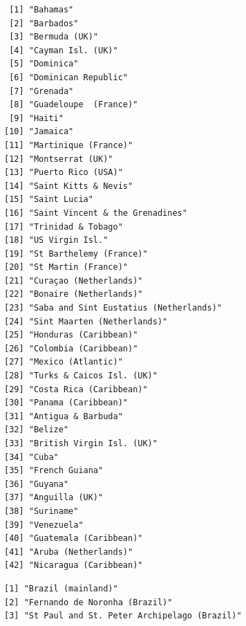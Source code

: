 \documentclass[
  letterpaper,
  oneside,
  open=any]{scrbook}
\newenvironment{Shaded}{\begin{snugshade}}{\end{snugshade}}
\newcommand{\CommentTok}[1]{\textcolor[rgb]{0.37,0.37,0.37}{#1}}
\newcommand{\FunctionTok}[1]{\textcolor[rgb]{0.28,0.35,0.67}{#1}}
\newcommand{\NormalTok}[1]{\textcolor[rgb]{0.00,0.23,0.31}{#1}}
\newcommand{\SpecialCharTok}[1]{\textcolor[rgb]{0.37,0.37,0.37}{#1}}
\newcommand{\StringTok}[1]{\textcolor[rgb]{0.13,0.47,0.30}{#1}}
\begin{document}
\begin{verbatim}
 [1] "Bahamas"                              
 [2] "Barbados"                             
 [3] "Bermuda (UK)"                         
 [4] "Cayman Isl. (UK)"                     
 [5] "Dominica"                             
 [6] "Dominican Republic"                   
 [7] "Grenada"                              
 [8] "Guadeloupe  (France)"                 
 [9] "Haiti"                                
[10] "Jamaica"                              
[11] "Martinique (France)"                  
[12] "Montserrat (UK)"                      
[13] "Puerto Rico (USA)"                    
[14] "Saint Kitts & Nevis"                  
[15] "Saint Lucia"                          
[16] "Saint Vincent & the Grenadines"       
[17] "Trinidad & Tobago"                    
[18] "US Virgin Isl."                       
[19] "St Barthelemy (France)"               
[20] "St Martin (France)"                   
[21] "Curaçao (Netherlands)"                
[22] "Bonaire (Netherlands)"                
[23] "Saba and Sint Eustatius (Netherlands)"
[24] "Sint Maarten (Netherlands)"           
[25] "Honduras (Caribbean)"                 
[26] "Colombia (Caribbean)"                 
[27] "Mexico (Atlantic)"                    
[28] "Turks & Caicos Isl. (UK)"             
[29] "Costa Rica (Caribbean)"               
[30] "Panama (Caribbean)"                   
[31] "Antigua & Barbuda"                    
[32] "Belize"                               
[33] "British Virgin Isl. (UK)"             
[34] "Cuba"                                 
[35] "French Guiana"                        
[36] "Guyana"                               
[37] "Anguilla (UK)"                        
[38] "Suriname"                             
[39] "Venezuela"                            
[40] "Guatemala (Caribbean)"                
[41] "Aruba (Netherlands)"                  
[42] "Nicaragua (Caribbean)"                
\end{verbatim}

\begin{Shaded}
\end{Shaded}

\begin{verbatim}
[1] "Brazil (mainland)"                         
[2] "Fernando de Noronha (Brazil)"              
[3] "St Paul and St. Peter Archipelago (Brazil)"
\end{verbatim}
\end{document}
